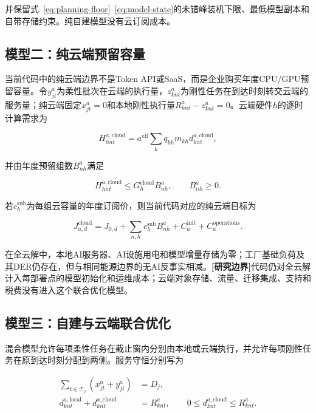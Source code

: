 \documentclass[preprint]{elsarticle}
\newcommand{\boundary}{\textcolor{black!65}{\textbf{[研究边界]}}}
\begin{document}
并保留式~\eqref{eq:planning-floor}--\eqref{eq:model-state}的未错峰装机下限、最低模型副本和自带存储约束。纯自建模型没有云订阅成本。

\subsection{模型二：纯云端预留容量}

当前代码中的纯云端边界不是Token API或SaaS，而是企业购买年度CPU/GPU预留容量。令$y^a_{jt}$为柔性批次在云端的执行量，$z^a_{knt}$为刚性任务在到达时刻转交云端的服务量；纯云端固定$x^a_{jt}=0$和本地刚性执行量$R^a_{knt}-z^a_{knt}=0$。云端硬件$h$的逐时计算需求为

\begin{equation}
 H^{a,\mathrm{cloud}}_{hnt}
 =a^{\mathrm{eff}}\sum_kq_{kh}m_{kh}d^{a,\mathrm{cloud}}_{knt},
 \label{eq:cloud-compute}
\end{equation}

并由年度预留组数$B^a_{nh}$满足

\begin{equation}
 H^{a,\mathrm{cloud}}_{hnt}
 \leq G_h^{\mathrm{cloud}}B^a_{nh},
 \qquad B^a_{nh}\geq0.
 \label{eq:cloud-reserved-capacity}
\end{equation}

若$c_h^{\mathrm{sub}}$为每组云容量的年度订阅价，则当前代码对应的纯云端目标为

\begin{equation}
 J^{\mathrm{cloud}}_{a,d}
 =J_{0,d}+\sum_{n,h}c_h^{\mathrm{sub}}B^a_{nh}
 +C_a^{\mathrm{init}}+C_a^{\mathrm{operations}}.
 \label{eq:pure-cloud-model}
\end{equation}

在全云解中，本地AI服务器、AI设施用电和模型增量存储为零；工厂基础负荷及其DER仍存在，但与相同能源边界的无AI反事实相减。\boundary 代码仍对全云解计入每部署点的模型初始化和运维成本；云端对象存储、流量、迁移集成、支持和税费没有进入这个联合优化模型。

\subsection{模型三：自建与云端联合优化}

混合模型允许每项柔性任务在截止窗内分别由本地或云端执行，并允许每项刚性任务在原到达时刻分配到两侧。服务守恒分别写为

\begin{align}
 \sum_{t\in\mathcal T_j}\left(x^a_{jt}+y^a_{jt}\right)&=D_j,
 \label{eq:hybrid-flexible-conservation}\\
 d^{a,\mathrm{local}}_{knt}+d^{a,\mathrm{cloud}}_{knt}
 &=R^a_{knt},
 \qquad 0\leq d^{a,\mathrm{cloud}}_{knt}\leq R^a_{knt}.
 \label{eq:hybrid-rigid-conservation}
\end{align}
\end{document}
